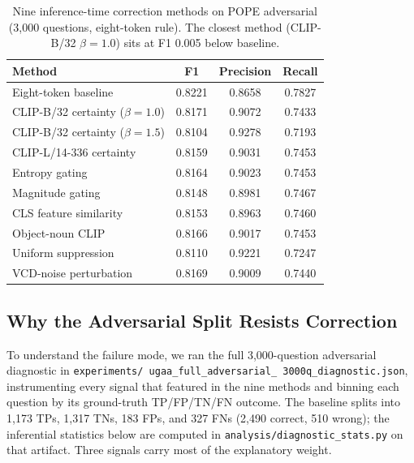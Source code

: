 \documentclass[11pt,letterpaper]{article}
\begin{document}
\begin{table}[t]
\caption{Nine inference-time correction methods on POPE adversarial
(3{,}000 questions, eight-token rule). The closest method (CLIP-B/32
$\beta{=}1.0$) sits at F1 0.005 below baseline.}
\label{tab:correction}
\centering
\begin{tabular}{lccc}
\toprule
Method & F1 & Precision & Recall \\
\midrule
Eight-token baseline & 0.8221 & 0.8658 & 0.7827 \\
\midrule
CLIP-B/32 certainty ($\beta = 1.0$) & 0.8171 & 0.9072 & 0.7433 \\
CLIP-B/32 certainty ($\beta = 1.5$) & 0.8104 & 0.9278 & 0.7193 \\
CLIP-L/14-336 certainty             & 0.8159 & 0.9031 & 0.7453 \\
Entropy gating                      & 0.8164 & 0.9023 & 0.7453 \\
Magnitude gating                    & 0.8148 & 0.8981 & 0.7467 \\
CLS feature similarity              & 0.8153 & 0.8963 & 0.7460 \\
Object-noun CLIP                    & 0.8166 & 0.9017 & 0.7453 \\
Uniform suppression                 & 0.8110 & 0.9221 & 0.7247 \\
VCD-noise perturbation              & 0.8169 & 0.9009 & 0.7440 \\
\bottomrule
\end{tabular}
\end{table}

\subsection{Why the Adversarial Split Resists Correction}
\label{sec:why}
\label{sec:whyfails}

To understand the failure mode, we ran the full 3,000-question
adversarial diagnostic in \texttt{experiments/\allowbreak
ugaa\_\allowbreak full\_\allowbreak adversarial\_\allowbreak
3000q\_\allowbreak diagnostic.json},
instrumenting every signal that featured in the nine methods and
binning each question by its ground-truth TP/FP/TN/FN outcome. The
baseline splits into 1{,}173 TPs, 1{,}317 TNs, 183 FPs, and 327 FNs
(2{,}490 correct, 510 wrong); the inferential statistics below are
computed in \texttt{analysis/diagnostic\_stats.py} on that artifact.
Three signals carry most of the explanatory weight.
\end{document}
